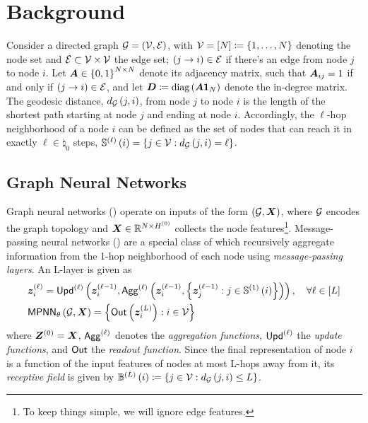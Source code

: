 \section{Background}

Consider a directed graph $\mathcal{G} = \left(\mathcal{V},\mathcal{E}\right)$, with $\mathcal{V} = \left[N\right] \coloneqq \left\{1,\ldots,N\right\}$ denoting the node set and $\mathcal{E}\subset\mathcal{V}\times\mathcal{V}$ the edge set; $\left(j \to i\right) \in \mathcal{E}$ if there's an edge from node $j$ to node $i$. Let $\bm{A} \in \left\{0,1\right\}^{N\times N}$ denote its adjacency matrix, such that $\bm{A}_{ij} = 1$ if and only if $\left(j \to i\right) \in \mathcal{E}$, and let $\bm{D} \coloneqq \text{diag}\left(\bm{A}\mathbf{1}_N\right)$ denote the in-degree matrix. The geodesic distance, $d_{\mathcal{G}}\left(j, i\right)$, from node $j$ to node $i$ is the length of the shortest path starting at node $j$ and ending at node $i$. Accordingly, the $\ell$-hop neighborhood of a node $i$ can be defined as the set of nodes that can reach it in exactly $\ell\in\natural_0$ steps, $\mathbb{S}^{\left(\ell\right)}\left(i\right) = \left\{j\in\mathcal{V}: d_{\mathcal{G}}\left(j,i\right) = \ell\right\}$. %

\subsection{Graph Neural Networks}
\label{sec:gnns}

Graph neural networks () operate on inputs of the form $\left(\mathcal{G},\bm{X}\right)$, where $\mathcal{G}$ encodes the graph topology and $\bm{X} \in \mathbb{R}^{N\times H^{\left(0\right)}}$ collects the node features\footnote{To keep things simple, we will ignore edge features.}. Message-passing neural networks () \cite{gilmer2017mpnn} are a special class of  which recursively aggregate information from the 1-hop neighborhood of each node using \textit{message-passing layers}. An L-layer  is given as
\begin{align}
\begin{split}
    &\bm{z}_i^{\left(\ell\right)} 
    =
    \mathsf{Upd}^{\left(\ell\right)} \left(\bm{z}_i^{\left(\ell-1\right)}, \mathsf{Agg}^{\left(\ell\right)} \left(\bm{z}_i^{\left(\ell-1\right)}, \left\{\bm{z}_j^{\left(\ell-1\right)}: j\in\mathbb{S}^{\left(1\right)}\left(i\right)\right\}\right)\right), \quad \forall \ell \in \left[L\right] \\
    &\mathsf{MPNN}_{\theta}\left(\mathcal{G},\bm{X}\right) = \left\{\mathsf{Out}\left(\bm{z}_i^{\left(L\right)}\right): i\in\mathcal{V}\right\}
\end{split}
\end{align}
where $\bm{Z}^{\left(0\right)} = \bm{X}$, $\mathsf{Agg}^{\left(\ell\right)}$ denotes the \textit{aggregation functions}, $\mathsf{Upd}^{\left(\ell\right)}$ the \textit{update functions}, and $\mathsf{Out}$ the \textit{readout function}. Since the final representation of node $i$ is a function of the input features of nodes at most L-hops away from it, its \textit{receptive field} is given by $\mathbb{B}^{\left(L\right)}\left(i\right) \coloneqq \left\{j\in\mathcal{V}: d_{\mathcal{G}}\left(j,i\right) \leq L\right\}$.

